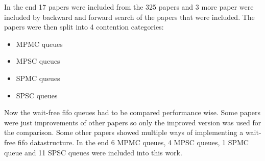 In the end 17 papers were included from the 325 papers and 3 more paper were included by backward and forward search of the papers that were included. The papers were then split into 4 contention categories:
\begin{itemize}
   \item \ac{MPMC} queues \cite{Kogan2011WaitFreeQueues,FeldmanDechevV2,RamalheteQueue,Verma2013Scalable,FastFetchAndAddWaitFreeQueue,wCQWaitFreeQueue}
   \item \ac{MPSC} queues \cite{WangCacheCoherent,jiffy,JayantiLog,Drescher2015GuardedSections}
   \item \ac{SPMC} queues \cite{Mateíspmc}
   \item \ac{SPSC} queues \cite{Lamport1983SPSCCircularBuffer,torquati2010singleproducersingleconsumerqueuessharedcache,Wang2013BQueue,MaffioneCacheAware,ffq}
\end{itemize}
Now the wait-free fifo queues had to be compared performance wise. Some papers were just improvements of other papers so only the improved version was used for the comparison. Some other papers showed multiple ways of implementing a wait-free fifo datastructure. In the end 6 \ac{MPMC} queues, 4 \ac{MPSC} queues, 1 \ac{SPMC} queue and 11 \ac{SPSC} queues were included into this work.